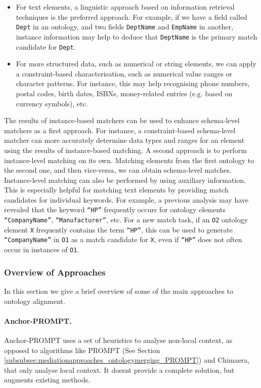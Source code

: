 \begin{itemize}
\item For text elements, a linguistic approach based on information
retrieval techniques is the preferred approach. For example, if we have
a field called \texttt{Dept} in an ontology, and two
fields \texttt{DeptName} and \texttt{EmpName}
in another, instance information may help to deduce that
\texttt{DeptName} is the primary match candidate for
\texttt{Dept}. 
\item For more structured data, such as numerical or string elements, we
can apply a constraint-based characterisation, such as numerical value
ranges or character patterns. For instance, this may help recognising
phone numbers, postal codes, birth dates, ISBNs, money-related entries
(e.g. based on currency symbols), etc. 
\end{itemize}
The results of instance-based matchers can be used to enhance
schema-level matchers as a first approach. For instance, a
constraint-based schema-level matcher can more accurately determine
data types and ranges for an element using the results of
instance-based matching. A second approach is to perform instance-level
matching on its own. Matching elements from the first ontology to the
second one, and then vice-versa, we can obtain schema-level matches.
Instance-level matching can also be performed by using auxiliary
information. This is especially helpful for matching text elements by
providing match candidates for individual keywords. For example, a
previous analysis may have revealed that the keyword
\texttt{{\textquotedblleft}HP{\textquotedblright}}
frequently occurs for ontology elements
\texttt{{\textquotedblleft}CompanyName{\textquotedblright}},
\texttt{{\textquotedblleft}Manufacturer{\textquotedblright}},
etc. For a new match task, if an \texttt{O2} ontology
element \texttt{X} frequently contains the term
\texttt{{\textquotedblleft}HP{\textquotedblright}}, this
can be used to generate
\texttt{{\textquotedblleft}CompanyName{\textquotedblright}}
in \texttt{O1} as a match candidate for
\texttt{X}, even if
\texttt{{\textquotedblleft}HP{\textquotedblright}} does
not often occur in instances of \texttt{O1}. 

\subsubsection{Overview of Approaches}
In this section we give a brief overview of some of the main approaches
to ontology alignment. 

\paragraph{Anchor-PROMPT.}
Anchor-PROMPT \cite{noy2000anchor_prompt} uses a set of heuristics to analyse
non-local context, as opposed to algorithms like PROMPT \cite{noy2000prompt} 
(See Section \ref{subsubsec:mediationapproaches_ontologymerging_PROMPT}) and Chimaera, that only analyse local context.
It doesn{\textquotesingle}t provide a complete solution, but augments
existing methods. 

